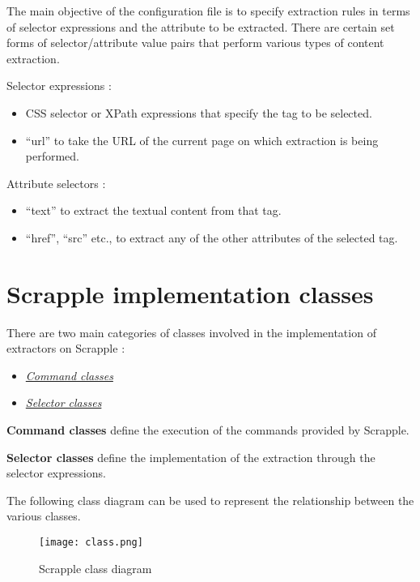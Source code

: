 \documentclass[letterpaper,12pt,english]{sphinxmanual}
\begin{document}
The main objective of the configuration file is to specify extraction rules in terms of selector expressions and the attribute to be extracted. There are certain set forms of selector/attribute value pairs that perform various types of content extraction.

Selector expressions :
\begin{itemize}
\item {} 
CSS selector or XPath expressions that specify the tag to be selected.

\item {} 
``url'' to take the URL of the current page on which extraction is being performed.

\end{itemize}

Attribute selectors :
\begin{itemize}
\item {} 
``text'' to extract the textual content from that tag.

\item {} 
``href'', ``src'' etc., to extract any of the other attributes of the selected tag.

\end{itemize}


\section{Scrapple implementation classes}
\label{implementation/classes:implementation-classes}\label{implementation/classes::doc}\label{implementation/classes:scrapple-implementation-classes}
There are two main categories of classes involved in the implementation of extractors on Scrapple :
\begin{itemize}
\item {} 
{\hyperref[implementation/commands:implementation-commands]{\emph{Command classes}}}

\item {} 
{\hyperref[implementation/selectors:implementation-selectors]{\emph{Selector classes}}}

\end{itemize}

\textbf{Command classes} define the execution of the commands provided by Scrapple.

\textbf{Selector classes} define the implementation of the extraction through the selector expressions.

The following class diagram can be used to represent the relationship between the various classes.
\begin{figure}[htbp]
\centering
\capstart

\texttt{[image: class.png]}
\caption{Scrapple class diagram}\end{figure}
\end{document}
